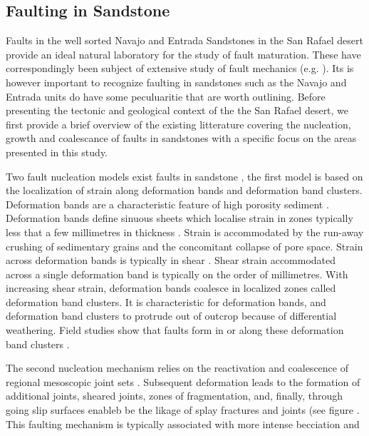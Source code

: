\documentclass[12pt,a4paper]{article}
\begin{document}
\subsection{Faulting in Sandstone}

Faults in the well sorted Navajo and Entrada Sandstones in the San Rafael desert provide an ideal natural laboratory for the study of fault maturation. These have correspondingly been subject of extensive study of fault mechanics (e.g. \cite{aydin1977faulting, aydin1978development, krantz1986orthorhombic, shipton2001damage, shipton2002structural, shipton2003conceptual, fossen1998deformation, fossen2005fault}  \cite{fossen2007deformation}). Its is however important to recognize faulting in sandstones such as the Navajo and Entrada units do have some peculuaritie that are worth outlining. Before presenting the tectonic and geological context of the the San Rafael desert, we first provide a brief overview of the existing litterature covering the nucleation, growth and coalescance of faults in sandstones with a specific focus on the areas presented in this study.

Two fault nucleation models exist faults in sandstone \cite{aydin1977faulting, davatzes2003overprinting}, the first model is based on the localization of strain along deformation bands and deformation band clusters. Deformation bands are a characteristic feature of high porosity sediment \cite{aydin1977faulting, aydin1978development, fossen2007deformation}. Deformation bands define sinuous sheets which localise strain in zones typically less that a few millimetres in thickness \cite{fossen2007deformation}. Strain is accommodated by the run-away crushing of sedimentary grains and the concomitant collapse of pore space. Strain across deformation bands is typically in shear \cite{fossen2007deformation}. Shear strain accommodated across a single deformation band is typically on the order of millimetres. With increasing shear strain, deformation bands coalesce in localized zones called  deformation band clusters. It is characteristic for deformation bands, and deformation band clusters to protrude out of outcrop because of differential weathering. Field studies show that faults form in or along these deformation band clusters \cite{aydin1977faulting}. 

The second nucleation mechanism relies on the reactivation and coalescence of regional mesoscopic joint sets \cite{myers1999structure, davatzes2003overprinting}. Subsequent deformation leads to the formation of additional joints, sheared joints, zones of fragmentation, and, finally, through going slip surfaces enableb be the likage of splay fractures and joints (see figure \cite{fault_nucleation_b}. This faulting mechanism is typically associated with more intense becciation and 
\end{document}
